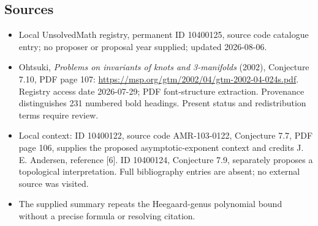 \documentclass[11pt]{article}
\begin{document}
\subsection{Sources}
\begin{itemize}
\item Local UnsolvedMath registry, permanent ID 10400125, source code catalogue entry; no proposer or proposal year supplied; updated 2026-08-06.
\item Ohtsuki, \emph{Problems on invariants of knots and 3-manifolds} (2002), Conjecture 7.10, PDF page 107: \url{https://msp.org/gtm/2002/04/gtm-2002-04-024s.pdf}. Registry access date 2026-07-29; PDF font-structure extraction. Provenance distinguishes 231 numbered bold headings. Present status and redistribution terms require review.
\item Local context: ID 10400122, source code AMR-103-0122, Conjecture 7.7, PDF page 106, supplies the proposed asymptotic-exponent context and credits J. E. Andersen, reference [6]. ID 10400124, Conjecture 7.9, separately proposes a topological interpretation. Full bibliography entries are absent; no external source was visited.
\item The supplied summary repeats the Heegaard-genus polynomial bound without a precise formula or resolving citation.
\end{itemize}
\end{document}
